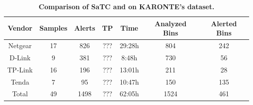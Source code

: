 \begin{table}[tb]
	\centering
	\small
	\begin{tabular}{cc:ccccc}
		\hline
		\textbf{Vendor} &  \textbf{Samples} & \textbf{Alerts} & \textbf{TP} & \textbf{Time} & \textbf{Analyzed Bins} & \textbf{Alerted Bins}\\
		\hline
		Netgear &  17 & 
        826 & ??? & 29:28h & 804 & 242 \\

		D-Link  &   9 & 
        381 & ??? & 8:48h & 730 & 56 \\

		TP-Link &  16 & 
        196 & ??? & 13:01h & 211 & 28\\

		Tenda   &  7 & 
        95  & ??? & 10:47h & 150 & 135 \\
		\hline
        Total   &  49 &
        1498 & ??? & 62:05h & 1524 & 461\\
        \hline
	\end{tabular}
	\caption{\textbf{Comparison of SaTC and \toolname on KARONTE's dataset.}}
	\label{tab:mango_cmdi}
\end{table}
